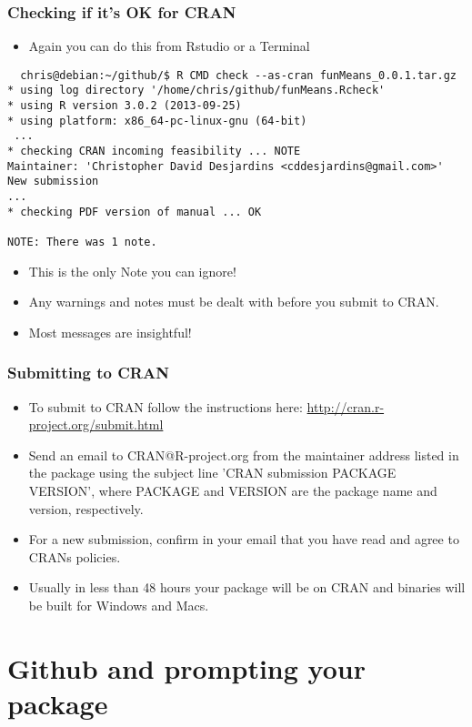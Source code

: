 \documentclass[xcolor=svgnames]{beamer}\usepackage[]{graphicx}\usepackage[]{color}
\begin{document}
\begin{frame}[fragile]
\frametitle{Checking if it's OK for CRAN}  
\begin{itemize}
  \item Again you can do this from Rstudio or a Terminal
\end{itemize}
    \begin{scriptsize}
\begin{verbatim}
  chris@debian:~/github/$ R CMD check --as-cran funMeans_0.0.1.tar.gz
* using log directory '/home/chris/github/funMeans.Rcheck'
* using R version 3.0.2 (2013-09-25)
* using platform: x86_64-pc-linux-gnu (64-bit)
 ...
* checking CRAN incoming feasibility ... NOTE
Maintainer: 'Christopher David Desjardins <cddesjardins@gmail.com>'
New submission
...
* checking PDF version of manual ... OK

NOTE: There was 1 note.
\end{verbatim}
\end{scriptsize}
\begin{itemize}
  \item This is the only Note you can ignore!
    \item Any warnings and notes must be dealt with before you submit to CRAN.
      \item Most messages are insightful!
\end{itemize}
\end{frame}

\begin{frame}
  \frametitle{Submitting to CRAN}
  \begin{itemize}
  \item To submit to CRAN follow the instructions here: \url{http://cran.r-project.org/submit.html}
  \item Send an email to CRAN@R-project.org from the maintainer address listed in the package using the subject line 'CRAN submission PACKAGE VERSION', where PACKAGE and VERSION are the package name and version, respectively. 
  \item For a new submission, confirm in your email that you have read and agree to CRANs policies.
    \item Usually in less than 48 hours your package will be on CRAN and binaries will be built for Windows and Macs.
  \end{itemize}
\end{frame}

\section{Github and prompting your package}
\end{document}
